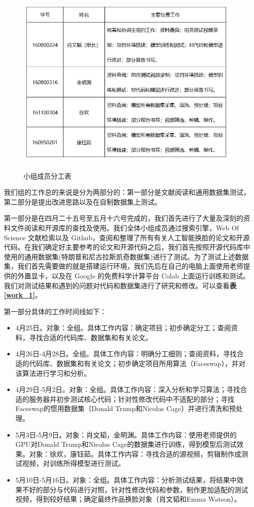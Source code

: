 \begin{figure}[h!]
	\caption{小组成员分工表}
	\centering
	\includegraphics[width=\textwidth]{work_desc.png}
	\label{work_desc}
\end{figure}


我们组的工作总的来说是分为两部分的：第一部分是文献阅读和通用数据集测试，第二部分是提出改进思路以及在自制数据集上测试。

第一部分是在四月二十五号至五月十六号完成的，我们首先进行了大量及深刻的资料文件阅读和开源库的查找及使用。我们全体小组成员通过搜索引擎，Web Of Science 文献检索以及 Github，查阅和整理了所有有关人工智能换脸的论文和开源代码。在我们确定好主要参考的论文和开源代码之后，我们首先按照开源代码库中使用的通用数据集(特朗普和尼古拉斯凯奇数据集)进行了测试。为了测试上述数据集，我们首先需要做的就是搭建运行环境，我们先后在自己的电脑上面使用老师提供的外置显卡，以及在 Google 的免费科学计算平台 Colab 上面运行训练和测试。我们对测试结果和遇到的问题对代码和数据集进行了研究和修改。可以查看\textbf{表 \ref{work_1}}。


第一部分具体的工作时间线如下：

\begin{itemize}
	\item 4月25日。对象：全组。具体工作内容：确定项目；初步确定分工；查阅资料，寻找合适的代码库、数据集和有关论文。
	\item 4月26日-4月28日。全组。具体工作内容：明确分工细则；查阅资料，寻找合适的代码库、数据集和有关论文；初步确定项目所用算法（Faceswap），并对该算法进行学习和分析。
	\item 4月29日-5月2日。对象：全组。具体工作内容：深入分析和学习算法；寻找合适的服务器并初步测试核心代码；针对性修改代码中不适配的部分；寻找Faceswap的惯用数据集（Donald Trump和Nicolas Cage）并进行清洗和预处理。
	\item 5月3日-5月9日。对象：肖文韬，金明渊。具体工作内容：使用老师提供的GPU对Donald Trump和Nicolas Cage的数据集进行训练，得到模型后测试效果。对象：徐欢，康钰茹。具体工作内容：寻找合适的源视频，剪辑制作成测试视频，对训练所得模型进行测试。
	\item 5月10日-5月16日。对象：全组。具体工作内容：分析测试结果，将结果中效果不好的部分与代码进行对照，针对性修改代码和参数，制作更加适配的测试视频，得到较好结果；确定最终作品换脸对象（肖文韬和Emma Watson）。
\end{itemize}


